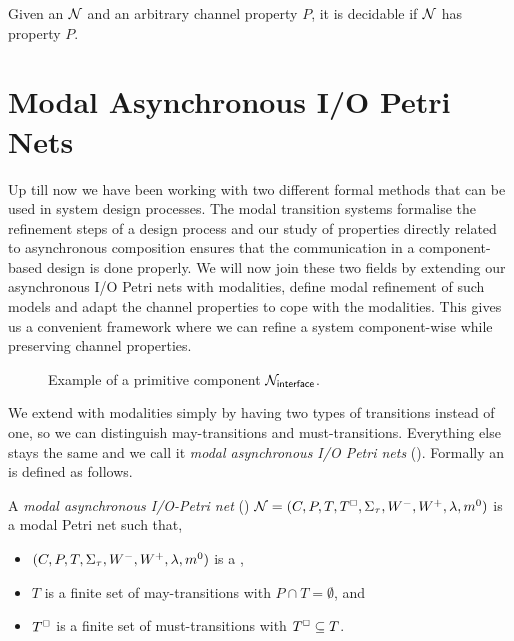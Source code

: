 \begin{result}[Decidability]
    Given an \AIOPN $\mathcal{N}$  and an arbitrary channel property $P$, it is decidable if $\mathcal{N}$ has property $P$. 
\end{result}

\section{Modal Asynchronous I/O Petri Nets}

Up till now we have been working with two different formal methods that can be used in system design processes. The modal transition systems formalise the refinement steps of a design process and our study of properties directly related to asynchronous composition ensures that the communication in a component-based design is done properly. We will now join these two fields by extending our asynchronous I/O Petri nets with modalities, define modal refinement of such models and adapt the channel properties to cope with the modalities. This gives us a convenient framework where we can refine a system component-wise while preserving channel properties.

\begin{figure}[ht]
    \centering
    
    \caption{Example of a primitive \MAIOPN component $\mathcal{N}_{\mathsf{interface}}$.}
    \label{fig:intro:maiopn-example-interface}
\end{figure}

We extend \AIOPNs with modalities simply by having two types of transitions instead of one, so we can distinguish may-transitions and must-transitions. Everything else stays the same and we call it \emph{modal asynchronous I/O Petri nets} (\MAIOPNs). Formally an \MAIOPN is defined as follows.  
\begin{definition}
    A \emph{modal asynchronous I/O-Petri net} (\MAIOPN) $\mathcal{N} = (C,\allowbreak
    P,\allowbreak
    T,\allowbreak
    T^{\scriptscriptstyle\square}, \allowbreak
    \Sigma_\tau,\allowbreak
    W^-,\allowbreak
    W^+,\allowbreak
    \lambda,\allowbreak
    m^0)$ is a modal Petri net such that,
    \begin{itemize}
        \item $(C,\allowbreak
    P,\allowbreak
    T,\allowbreak
    \Sigma_\tau,\allowbreak
    W^-,\allowbreak
    W^+,\allowbreak
    \lambda,\allowbreak
    m^0)$ is a \AIOPN, 
        \item $T$ is a finite set of may-transitions with $P \cap T = \emptyset$, and
        \item $T^{\scriptscriptstyle\square}$ is a finite set of must-transitions with $T^{\scriptscriptstyle\square} \subseteq T$.
    \end{itemize}

\end{definition}


